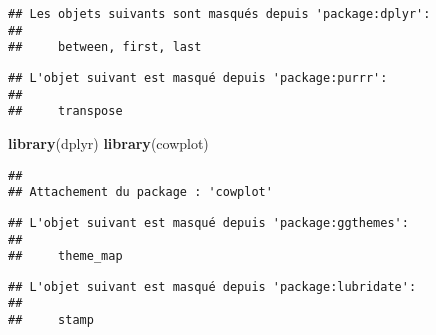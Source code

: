 \documentclass[
]{article}
\newenvironment{Shaded}{\begin{snugshade}}{\end{snugshade}}
\newcommand{\FunctionTok}[1]{\textcolor[rgb]{0.13,0.29,0.53}{\textbf{#1}}}
\newcommand{\NormalTok}[1]{#1}
\begin{document}
\begin{verbatim}
## Les objets suivants sont masqués depuis 'package:dplyr':
## 
##     between, first, last
\end{verbatim}

\begin{verbatim}
## L'objet suivant est masqué depuis 'package:purrr':
## 
##     transpose
\end{verbatim}

\begin{Shaded}
\begin{Highlighting}[]
\FunctionTok{library}\NormalTok{(dplyr)}
\FunctionTok{library}\NormalTok{(cowplot)}
\end{Highlighting}
\end{Shaded}

\begin{verbatim}
## 
## Attachement du package : 'cowplot'
\end{verbatim}

\begin{verbatim}
## L'objet suivant est masqué depuis 'package:ggthemes':
## 
##     theme_map
\end{verbatim}

\begin{verbatim}
## L'objet suivant est masqué depuis 'package:lubridate':
## 
##     stamp
\end{verbatim}
\end{document}
